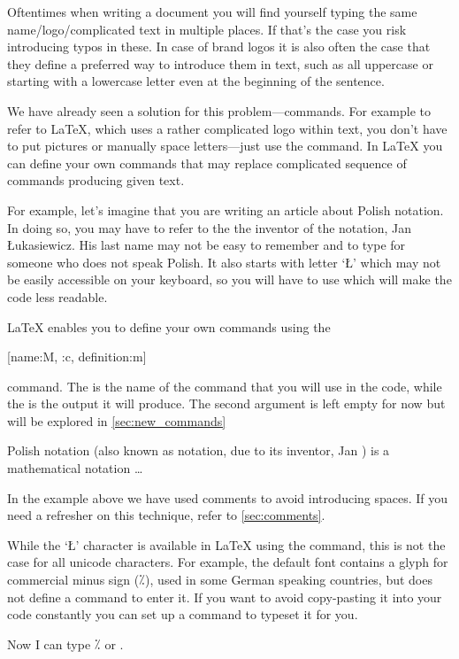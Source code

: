 Oftentimes when writing a document you will find yourself typing the same
name\slash{}logo\slash{}complicated text in multiple places. If that's the case
you risk introducing typos in these. In case of brand logos it is also often
the case that they define a preferred way to introduce them in text, such as
all uppercase or starting with a lowercase letter even at the beginning of the
sentence.

We have already seen a solution for this problem---commands. For example to
refer to \LaTeX{}, which uses a rather complicated logo within text, you don't
have to put pictures or manually space letters---just use the 
command. In \LaTeX{} you can define your own commands that may replace
complicated sequence of commands producing given text.

For example, let's imagine that you are writing an article about Polish
notation. In doing so, you may have to refer to the the inventor of the
notation, Jan Łukasiewicz. His last name may not be easy to remember and to
type for someone who does not speak Polish. It also starts with letter
\enquote*{Ł} which may not be easily accessible on your keyboard, so you will
have to use  which will make the code less readable.

\LaTeX{} enables you to define your own commands using the
\begin{lscommand}
  [name:M, {{}}:c, definition:m]
\end{lscommand}
command. The  is the name of the command that you will use in the
code, while the  is the output it will produce. The second
argument is left empty for now but will be explored in
\autoref{sec:new_commands}
\begin{example}

Polish notation (also known as
\lukas{} notation, due to its
inventor, Jan \lukas) is a
mathematical notation \ldots{}
\end{example}
In the example above we have used \ai{\%} comments to avoid introducing spaces.
If you need a refresher on this technique, refer to \autoref{sec:comments}.

While the \enquote*{Ł} character is available in \LaTeX{} using the 
command, this is not the case for all unicode characters. For example, the
default font contains a glyph for commercial minus sign (⁒), used in some German
speaking countries, but does not define a command to enter it. If you want to
avoid copy-pasting it into your code constantly you can set up a command to
typeset it for you.
\begin{example}

Now I can type ⁒ or \comminus.
\end{example}

